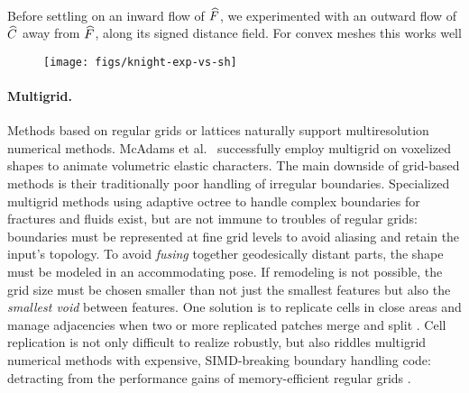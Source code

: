\paragraph{}
Before settling on an inward flow of $\widehat{F}$, we experimented with an outward
flow of $\widehat{C}$ away from $\widehat{F}$, along its signed distance field.
%
For convex meshes this works well

\begin{figure}
  \texttt{[image: figs/knight-exp-vs-sh]}
  \caption{}
  \label{fig:knight-exp-vs-sh}
  \vspace*{-5mm}
\end{figure}

\paragraph{Multigrid.}
%
Methods based on regular grids or lattices naturally support multiresolution
numerical methods.
%
McAdams et al.\ 
successfully employ multigrid on voxelized shapes to animate
volumetric elastic characters.
%
The main downside of grid-based methods is their traditionally poor handling of
irregular boundaries.
%
Specialized multigrid methods using adaptive octree to handle complex
boundaries for fractures \cite{Dick:2011} and fluids \cite{Ferstl:2014} exist,
but are not immune to troubles of regular grids: boundaries must be 
represented at fine grid levels to avoid aliasing and retain the input's
topology.
%
To avoid \emph{fusing} together geodesically distant parts, the
shape must be modeled in an accommodating pose. If remodeling is not
possible, the grid size must be chosen smaller than not just the smallest
features but also the \emph{smallest void} between features.
%
One solution is to replicate cells in close areas and manage
adjacencies when two or more replicated patches merge and split
\cite{Teran:2005:CSS,Nesme:2009:PTE,Sykora09}.
%
Cell replication is not only difficult to realize robustly, but also riddles
multigrid numerical methods with expensive, SIMD-breaking boundary handling
code: detracting from the performance gains of memory-efficient regular grids
\cite{Demmel04}.

